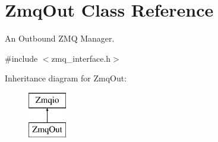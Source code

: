 \hypertarget{classZmqOut}{\section{Zmq\-Out Class Reference}
\label{classZmqOut}
}


An Outbound Z\-M\-Q Manager.  




{\ttfamily \#include $<$zmq\-\_\-interface.\-h$>$}

Inheritance diagram for Zmq\-Out\-:\begin{figure}[H]
\begin{center}
\leavevmode
\includegraphics[height=2.000000cm]{classZmqOut}
\end{center}
\end{figure}
